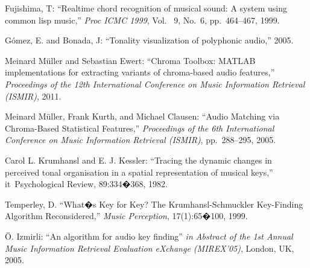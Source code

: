 \documentclass{article}
\begin{document}
%
%
%
\begin{thebibliography}{citations}

Fujishima, T:
``Realtime chord recognition of musical sound: A system using common lisp music,''  
{\it Proc ICMC 1999}, 
Vol. ~9, No.~6, pp.~464--467, 1999.

G{\'o}mez, E. and Bonada, J:
``Tonality visualization of polyphonic audio,''
2005.

Meinard M{\"u}ller and Sebastian Ewert:
``{C}hroma {T}oolbox: {MATLAB} implementations for extracting variants of chroma-based audio features,''
{\it Proceedings of the 12th International Conference on Music Information Retrieval ({ISMIR})}, 2011.

Meinard M{\"u}ller, Frank Kurth, and Michael Clausen:
``Audio Matching via Chroma-Based Statistical Features,''
{\it Proceedings of the 6th International Conference on Music Information Retrieval ({ISMIR})}, pp.~288--295, 2005.

Carol L. Krumhansl and E. J. Kessler: 
``Tracing the dynamic changes in perceived tonal organisation in a spatial representation of musical keys,''
{it\ Psychological Review}, 89:334�368, 1982.

Temperley, D. 
``What�s Key for Key? The Krumhansl-Schmuckler Key-Finding Algorithm Reconsidered,''
{\it Music Perception}, 17(1):65�100, 1999.

\"O. Izmirli:
``An algorithm for audio key finding'' 
{\it in Abstract of the 1st Annual Music Information Retrieval Evaluation eXchange (MIREX'05)}, London, UK, 2005.

%

%
\end{thebibliography}
\end{document}
